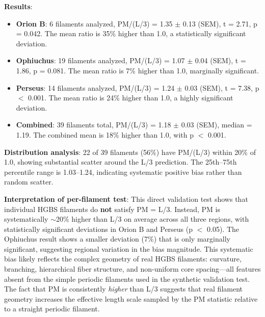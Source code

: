 \documentclass[twoside,twocolumn]{mnras}
\begin{document}
\textbf{Results}:
\begin{itemize}
    \item \textbf{Orion B}: 6 filaments analyzed, PM/(L/3) = 1.35 $\pm$ 0.13 (SEM), t = 2.71, p = 0.042. The mean ratio is 35\% higher than 1.0, a statistically significant deviation.
    \item \textbf{Ophiuchus}: 19 filaments analyzed, PM/(L/3) = 1.07 $\pm$ 0.04 (SEM), t = 1.86, p = 0.081. The mean ratio is 7\% higher than 1.0, marginally significant.
    \item \textbf{Perseus}: 14 filaments analyzed, PM/(L/3) = 1.24 $\pm$ 0.03 (SEM), t = 7.38, p $<$ 0.001. The mean ratio is 24\% higher than 1.0, a highly significant deviation.
    \item \textbf{Combined}: 39 filaments total, PM/(L/3) = 1.18 $\pm$ 0.03 (SEM), median = 1.19. The combined mean is 18\% higher than 1.0, with p $<$ 0.001.
\end{itemize}

\textbf{Distribution analysis}: 22 of 39 filaments (56\%) have PM/(L/3) within 20\% of 1.0, showing substantial scatter around the L/3 prediction. The 25th--75th percentile range is 1.03--1.24, indicating systematic positive bias rather than random scatter.

\textbf{Interpretation of per-filament test}: This direct validation test shows that individual HGBS filaments do \textbf{not} satisfy PM = L/3. Instead, PM is systematically $\sim$20\% higher than L/3 on average across all three regions, with statistically significant deviations in Orion B and Perseus (p $<$ 0.05). The Ophiuchus result shows a smaller deviation (7\%) that is only marginally significant, suggesting regional variation in the bias magnitude. This systematic bias likely reflects the complex geometry of real HGBS filaments: curvature, branching, hierarchical fiber structure, and non-uniform core spacing---all features absent from the simple periodic filaments used in the synthetic validation test. The fact that PM is consistently \textit{higher} than L/3 suggests that real filament geometry increases the effective length scale sampled by the PM statistic relative to a straight periodic filament.
\end{document}
